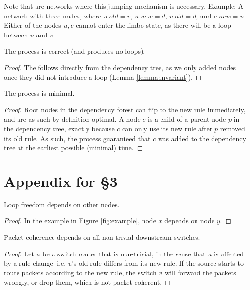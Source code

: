 Note that are networks where this jumping mechanism is necessary. Example: A network with three nodes, where $u.old = v$, $u.new = d$, $v.old = d$, and $v.new = u$. Either of the nodes $u,v$ cannot enter the limbo state, as there will be a loop between $u$ and $v$.

\begin{lemma}\label{lemma:correctness} The process is correct (and produces no loops).
\end{lemma}

\begin{proof} The follows directly from the dependency tree, as we only added nodes once they did not introduce a loop (Lemma \ref{lemma:invariant}).
\end{proof}

\begin{lemma}\label{lemma:minimal} The process is minimal.
\end{lemma}

\begin{proof}
Root nodes in the dependency forest can flip to the new rule immediately, and are as such by definition optimal. A node $c$ is a child of a parent node $p$ in the dependency tree, exactly because $c$ can only use its new rule after $p$ removed its old rule. As such, the process guaranteed that $c$ was added to the dependency tree at the earliest possible (minimal) time.
\end{proof}

\section{Appendix for \S3}
\label{sec:app2}


\begin{lemma}\label{lemma:imp loop-free} Loop freedom depends on other nodes.
\end{lemma}

\begin{proof}
In the example in Figure \ref{fig:example}, node $x$ depends on node $y$.
\end{proof}

\begin{lemma}\label{lemma:imp packet coherence} Packet coherence depends on all non-trivial downstream switches.
\end{lemma}

\begin{proof} Let $u$ be a switch router that is non-trivial, in the sense that $u$ is affected by a rule change, i.e. $u$'s old rule differs from its new rule. If the source starts to route packets according to the new rule, the switch $u$ will forward the packets wrongly, or drop them, which is not packet coherent.
\end{proof}

